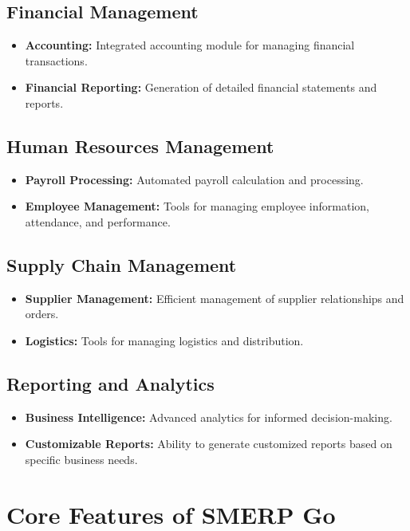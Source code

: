 \documentclass[a4paper,12pt]{report}
\begin{document}
	\subsection{Financial Management}
	\begin{itemize}
		\item \textbf{Accounting:} Integrated accounting module for managing financial transactions.
		\item \textbf{Financial Reporting:} Generation of detailed financial statements and reports.
	\end{itemize}
	
	\subsection{Human Resources Management}
	\begin{itemize}
		\item \textbf{Payroll Processing:} Automated payroll calculation and processing.
		\item \textbf{Employee Management:} Tools for managing employee information, attendance, and performance.
	\end{itemize}
	
	\subsection{Supply Chain Management}
	\begin{itemize}
		\item \textbf{Supplier Management:} Efficient management of supplier relationships and orders.
		\item \textbf{Logistics:} Tools for managing logistics and distribution.
	\end{itemize}
	
	\subsection{Reporting and Analytics}
	\begin{itemize}
		\item \textbf{Business Intelligence:} Advanced analytics for informed decision-making.
		\item \textbf{Customizable Reports:} Ability to generate customized reports based on specific business needs.
	\end{itemize}
	
	\section{Core Features of SMERP Go}
	
\end{document}
